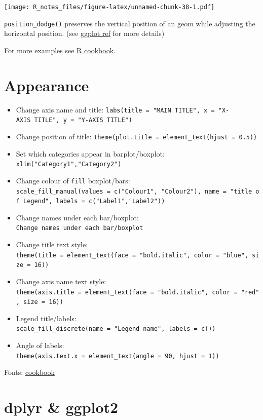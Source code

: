 \documentclass[]{book}
\providecommand{\tightlist}{%
  \setlength{\itemsep}{0pt}\setlength{\parskip}{0pt}}
\begin{document}
\texttt{[image: R\_notes\_files/figure-latex/unnamed-chunk-38-1.pdf]}

\texttt{position\_dodge()} preserves the vertical position of an geom
while adjusting the horizontal position. (see
\href{https://ggplot2.tidyverse.org/reference/position_dodge.html}{ggplot
ref} for more details)

For more examples see
\href{http://www.cookbook-r.com/Graphs/Plotting_means_and_error_bars_(ggplot2)/}{R
cookbook}.

\section{Appearance}\label{appearance}

\begin{itemize}
\tightlist
\item
  Change axis name and title:
  \texttt{labs(title\ =\ "MAIN\ TITLE",\ x\ =\ "X-AXIS\ TITLE",\ y\ =\ "Y-AXIS\ TITLE")}
\item
  Change position of title:
  \texttt{theme(plot.title\ =\ element\_text(hjust\ =\ 0.5))}
\item
  Set which categories appear in barplot/boxplot:
  \texttt{xlim("Category1","Category2")}
\item
  Change colour of \texttt{fill} boxplot/bars:
  \texttt{scale\_fill\_manual(values\ =\ c("Colour1",\ "Colour2"),\ name\ =\ "title\ of\ Legend",\ labels\ =\ c("Label1","Label2"))}
\item
  Change names under each bar/boxplot:
  \texttt{Change\ names\ under\ each\ bar/boxplot}
\item
  Change title text style:
  \texttt{theme(title\ =\ element\_text(face\ =\ "bold.italic",\ color\ =\ "blue",\ size\ =\ 16))}
\item
  Change axis name text style:
  \texttt{theme(axis.title\ =\ element\_text(face\ =\ "bold.italic",\ color\ =\ "red",\ size\ =\ 16))}
\item
  Legend title/labels:
  \texttt{scale\_fill\_discrete(name\ =\ "Legend\ name",\ labels\ =\ c())}
\item
  Angle of labels:
  \texttt{theme(axis.text.x\ =\ element\_text(angle\ =\ 90,\ hjust\ =\ 1))}
\end{itemize}

Fonts: \href{http://www.cookbook-r.com/Graphs/Fonts/}{cookbook}

\section{dplyr \& ggplot2}\label{dplyr-ggplot2}
\end{document}
